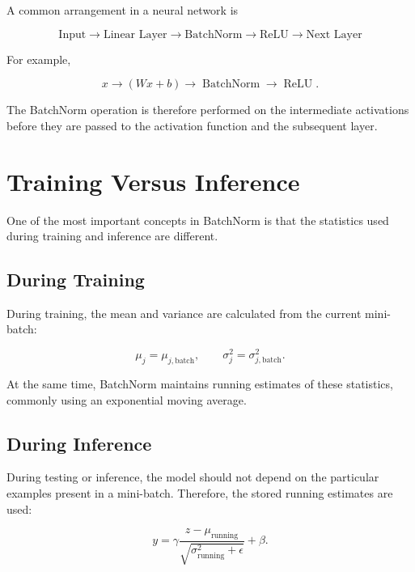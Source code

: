\documentclass[11pt,a4paper]{article}
\begin{document}
	A common arrangement in a neural network is
	
	\begin{equation}
		\boxed{
			\text{Input}
			\rightarrow
			\text{Linear Layer}
			\rightarrow
			\text{BatchNorm}
			\rightarrow
			\text{ReLU}
			\rightarrow
			\text{Next Layer}
		}
	\end{equation}
	
	For example,
	
	\[
	x
	\rightarrow
	(Wx+b)
	\rightarrow
	\operatorname{BatchNorm}
	\rightarrow
	\operatorname{ReLU}.
	\]
	
	The BatchNorm operation is therefore performed on the intermediate
	activations before they are passed to the activation function and the
	subsequent layer.
	
	\section{Training Versus Inference}
	
	One of the most important concepts in BatchNorm is that the statistics
	used during training and inference are different.
	
	\subsection{During Training}
	
	During training, the mean and variance are calculated from the current
	mini-batch:
	
	\begin{equation}
		\mu_j=\mu_{j,\mathrm{batch}},
		\qquad
		\sigma_j^2=\sigma_{j,\mathrm{batch}}^2.
	\end{equation}
	
	At the same time, BatchNorm maintains running estimates of these
	statistics, commonly using an exponential moving average.
	
	\subsection{During Inference}
	
	During testing or inference, the model should not depend on the particular
	examples present in a mini-batch. Therefore, the stored running estimates
	are used:
	
	\begin{equation}
		y =
		\gamma
		\frac{z-\mu_{\mathrm{running}}}
		{\sqrt{\sigma_{\mathrm{running}}^2+\epsilon}}
		+\beta.
	\end{equation}
	
\end{document}
